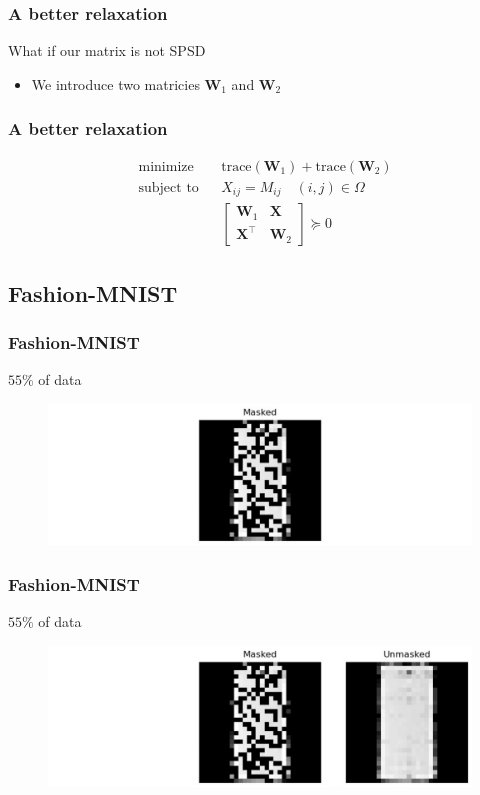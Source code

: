 \documentclass[
	11pt, %
]{beamer}
\begin{document}
\begin{frame}
	\frametitle{A better relaxation}
	What if our matrix is not SPSD
	\begin{itemize}
		\item We introduce two matricies $\mathbf{W}_1$ and $\mathbf{W}_2$ 
	\end{itemize}
\end{frame}

\begin{frame}
	\frametitle{A better relaxation}

	\begin{equation*}
		\begin{aligned}
		& {\text{minimize}}
		& & \text{trace}(\mathbf{W}_1) + \text{trace}(\mathbf{W}_2) \\[1pt]
		& \text{subject to}
		& & X_{ij} = M_{ij} \quad (i,j) \in \Omega\\[1pt]
		&&& \begin{bmatrix} 
		  \mathbf{W}_1 & \mathbf{X} \\
		  \mathbf{X}^\top & \mathbf{W}_2
		\end{bmatrix} \succeq 0 
		\end{aligned}
	  \end{equation*}	
\end{frame}

\subsection{Fashion-MNIST} 

\begin{frame}
	\frametitle{Fashion-MNIST}
	$55 \%$ of data
	\begin{figure}
		\centering
		\includegraphics[scale=.3]{assets/mc_ex1_masked.jpeg}
	\end{figure}
\end{frame}

\begin{frame}
	\frametitle{Fashion-MNIST}
	$55 \%$ of data
	\begin{figure}
		\centering
		\includegraphics[scale=.3]{assets/mc_ex1_unmasked.jpeg}
	\end{figure}
\end{frame}
\end{document}

